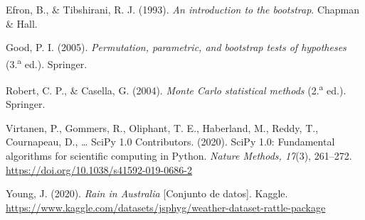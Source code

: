 \documentclass[11pt,a4paper]{article}
\begin{document}
Efron, B., \& Tibshirani, R. J. (1993). \textit{An introduction to the bootstrap}. Chapman \& Hall.

Good, P. I. (2005). \textit{Permutation, parametric, and bootstrap tests of hypotheses} (3.\textsuperscript{a} ed.). Springer.

Robert, C. P., \& Casella, G. (2004). \textit{Monte Carlo statistical methods} (2.\textsuperscript{a} ed.). Springer.

Virtanen, P., Gommers, R., Oliphant, T. E., Haberland, M., Reddy, T., Cournapeau, D., \ldots{} SciPy 1.0 Contributors. (2020). SciPy 1.0: Fundamental algorithms for scientific computing in Python. \textit{Nature Methods, 17}(3), 261--272. \url{https://doi.org/10.1038/s41592-019-0686-2}

Young, J. (2020). \textit{Rain in Australia} [Conjunto de datos]. Kaggle. \url{https://www.kaggle.com/datasets/jsphyg/weather-dataset-rattle-package}
\end{document}
